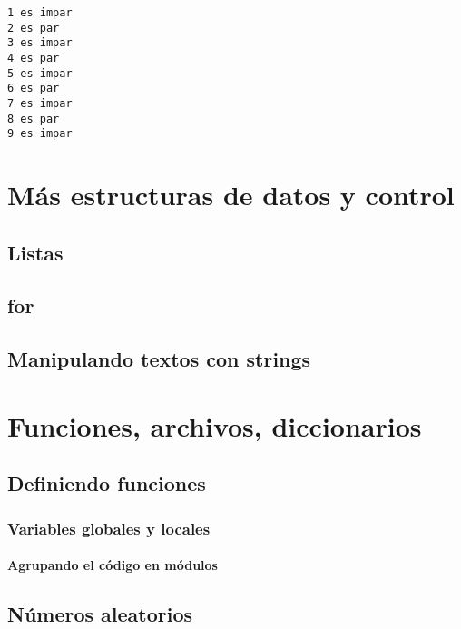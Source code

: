 \documentclass[a4paper,12pt,spanish]{sphinxmanual}
\begin{document}
\begin{Verbatim}[commandchars=\\\{\}]
1 es impar
2 es par
3 es impar
4 es par
5 es impar
6 es par
7 es impar
8 es par
9 es impar
\end{Verbatim}


\chapter{Más estructuras de datos y control}
\label{Unidad03:mas-estructuras-de-datos-y-control}\label{Unidad03::doc}

\section{Listas}
\label{Unidad03:listas}

\section{for}
\label{Unidad03:for}

\section{Manipulando textos con strings}
\label{Unidad03:manipulando-textos-con-strings}

\chapter{Funciones, archivos, diccionarios}
\label{Unidad04::doc}\label{Unidad04:funciones-archivos-diccionarios}

\section{Definiendo funciones}
\label{Unidad04:definiendo-funciones}

\subsection{Variables globales y locales}
\label{Unidad04:variables-globales-y-locales}

\subsubsection{Agrupando el código en módulos}
\label{Unidad04:agrupando-el-codigo-en-modulos}

\section{Números aleatorios}
\label{Unidad04:numeros-aleatorios}
\end{document}
